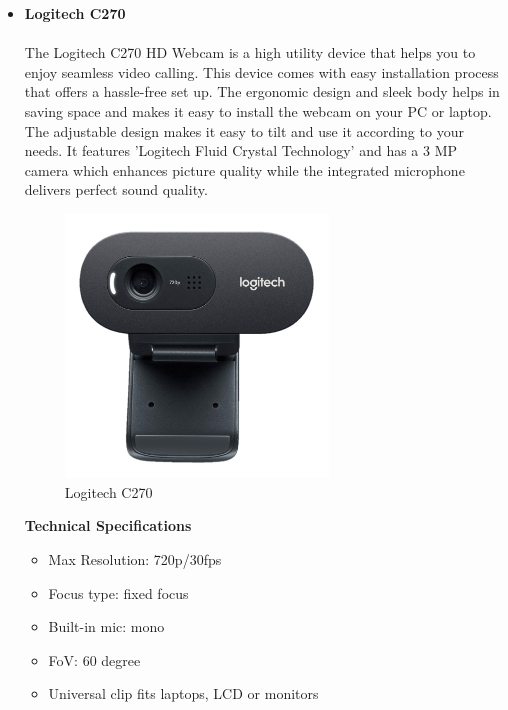 \begin{itemize}[wide, labelwidth=!, labelindent=0pt]
    \newpage
    
    \item \textbf{Logitech C270}
    \vspace{-0.5cm}
    \paragraph{}The Logitech C270 HD Webcam is a high utility device that helps you to enjoy seamless video calling. This device comes with easy installation process that offers a hassle-free set up. The ergonomic design and sleek body helps in saving space and makes it easy to install the webcam on your PC or laptop. The adjustable design makes it easy to tilt and use it according to your needs. It features 'Logitech Fluid Crystal Technology' and has a 3 MP camera which enhances picture quality while the integrated microphone delivers perfect sound quality.
    
    
    \begin{figure}[H]
    \centering
    \includegraphics[width = 7cm]{project/images/webcam.jpg}
    \caption{Logitech C270}
    \end{figure}
    
    \begin{center}{\textbf{Technical Specifications}}\end{center}
    
    \begin{itemize}
        \item Max Resolution: 720p/30fps
        \item Focus type: fixed focus
        \item Built-in mic: mono
        \item FoV: 60 degree
        \item Universal clip fits laptops, LCD or monitors
    \end{itemize}

\end{itemize}

